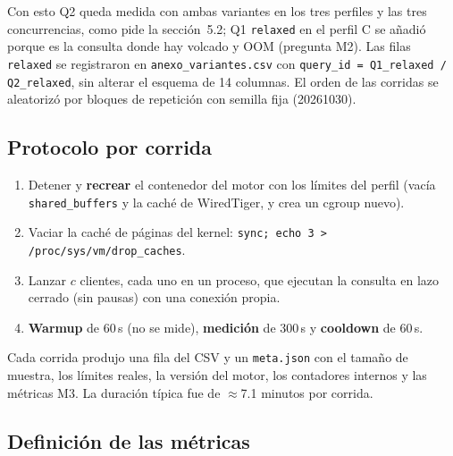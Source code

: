 \documentclass[11pt,a4paper]{article}
\begin{document}
Con esto Q2 queda medida con ambas variantes en los tres perfiles y las tres concurrencias, como pide la sección~5.2; Q1 \texttt{relaxed} en el perfil C se añadió porque es la consulta donde hay volcado y OOM (pregunta M2). Las filas \texttt{relaxed} se registraron en \texttt{anexo\_variantes.csv} con \texttt{query\_id = Q1\_relaxed / Q2\_relaxed}, sin alterar el esquema de 14 columnas. El orden de las corridas se aleatorizó por bloques de repetición con semilla fija (20261030).

\subsection{Protocolo por corrida}

\begin{enumerate}
  \item Detener y \textbf{recrear} el contenedor del motor con los límites del perfil (vacía \texttt{shared\_buffers} y la caché de WiredTiger, y crea un cgroup nuevo).
  \item Vaciar la caché de páginas del kernel: \texttt{sync; echo 3 > /proc/sys/vm/drop\_caches}.
  \item Lanzar $c$ clientes, cada uno en un proceso, que ejecutan la consulta en lazo cerrado (sin pausas) con una conexión propia.
  \item \textbf{Warmup} de 60\,s (no se mide), \textbf{medición} de 300\,s y \textbf{cooldown} de 60\,s.
\end{enumerate}

Cada corrida produjo una fila del CSV y un \texttt{meta.json} con el tamaño de muestra, los límites reales, la versión del motor, los contadores internos y las métricas M3. La duración típica fue de $\approx$7.1 minutos por corrida.

\subsection{Definición de las métricas}
\end{document}
